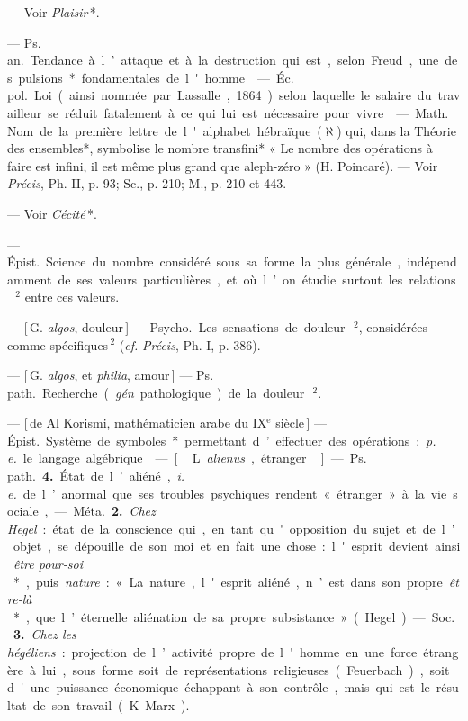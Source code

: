 \begin{itemize}[leftmargin=1cm, label=, itemsep=1pt]
{ — Voir {\it Plaisir}\,*.

 — \si{Ps. an.} Tendance à
l’attaque et à la destruction qui est,
selon Freud, une des pulsions* fondamentales de l'homme.

 — \si{Éc. pol.} Loi (ainsi
nommée par Lassalle, 1864) selon
laquelle le salaire du travailleur se
réduit fatalement à ce qui lui est
nécessaire pour vivre.

 — \si{Math.} Nom de la première
lettre de l'alphabet hébraïque ($\aleph$)
qui, dans la Théorie des ensembles*,
symbolise le nombre transfini*
« Le nombre des opérations à faire
est infini, il est même plus grand
que aleph-zéro » (H. Poincaré). —
Voir {\it Précis}, Ph. II, p. 93; Sc., p. 210;
M., p. 210 et 443.

 — Voir {\it Cécité}\,*.

 — \si{Épist.} Science du nombre
considéré sous sa forme la plus générale, indépendamment de ses valeurs
particulières, et où l’on étudie surtout les relations\,$^2$ entre ces valeurs.

 — [\,G. {\it algos}, douleur\,] — \si{Psycho.} Les sensations de
douleur\,$^2$, considérées comme spécifiques\,$^2$ ({\it cf.}  {\it Précis}, Ph. I, p. 386).

 — [\,G. {\it algos}, et {\it philia}, amour\,]
— \si{Ps. path.} Recherche ({\it gén}. pathologique) de la douleur\,$^2$.

 — [\,de Al Korismi, mathématicien arabe du {\footnotesize IX}$^\text{e}$ siècle\,] — \si{Épist.}
Système de symboles* permettant
d’effectuer des opérations : {\it p. e.} le
langage algébrique.

 — [\,L. {\it alienus}, étranger\,] —
\si{Ps. path.} {\bf 4.} État de l’aliéné, {\it i. e.} de
l’anormal que ses troubles psychiques rendent « étranger » à la
vie sociale,

— \si{Méta.} {\bf 2.} {\it Chez Hegel} : état de la
conscience qui, en tant qu'opposition du sujet et de l’objet,
se dépouille de son moi et en fait une
chose: l'esprit devient ainsi {\it être
pour-soi}\,*, puis {\it nature} : « La nature,
l'esprit aliéné, n’est dans son propre
{\it être-là}\,*, que l’éternelle aliénation de
sa propre subsistance » (Hegel).

— \si{Soc.} {\bf 3.} {\it Chez les hégéliens} : projection de l’activité propre de l'homme
en une force étrangère à lui, sous
forme soit de représentations religieuses (Feuerbach), soit d'une
puissance économique échappant à
son contrôle, mais qui est le résultat
de son travail (K. Marx).

}
\end{itemize}
